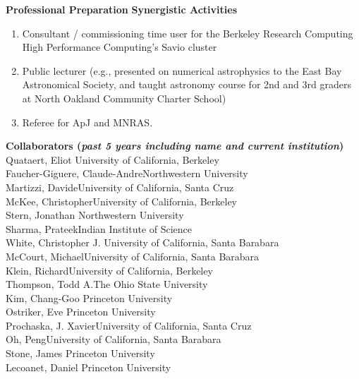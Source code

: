 \documentclass[11pt,letterpaper,english]{article}
\begin{document}
\begin{flushleft} {\bf Professional Preparation}
\vspace{.04in}
{\bf Synergistic Activities}
\vspace{-6pt}
\begin{enumerate} \itemsep1pt \parskip0pt 
\item Consultant / commissioning time user for the Berkeley Research Computing High Performance Computing's Savio cluster
\item Public lecturer (e.g., presented on numerical astrophysics to the East Bay Astronomical Society, and taught astronomy course for 2nd and 3rd graders at North Oakland Community Charter School) \\
\item Referee for ApJ and MNRAS. \\
\end{enumerate} 

\vspace{-6pt}
{\bf Collaborators ({\emph{past 5 years including name and current institution}})} \\
{\parindent 16pt
Quataert, Eliot \hfill University of California, Berkeley \\
Faucher-Giguere, Claude-Andre\hfill Northwestern University \\
Martizzi, Davide\hfill University of California, Santa Cruz \\
McKee, Christopher\hfill University of California, Berkeley \\
Stern, Jonathan \hfill Northwestern University \\
Sharma, Prateek\hfill Indian Institute of Science \\
White, Christopher J. \hfill University of California, Santa Barabara \\
McCourt, Michael\hfill University of California, Santa Barabara \\
Klein, Richard\hfill University of California, Berkeley \\
Thompson, Todd A.\hfill The Ohio State University \\
Kim, Chang-Goo \hfill Princeton University \\
Ostriker, Eve \hfill Princeton University \\
Prochaska, J. Xavier\hfill University of California, Santa Cruz \\
Oh, Peng\hfill University of California, Santa Barabara \\
Stone, James \hfill Princeton University \\
Lecoanet, Daniel \hfill Princeton University \\
}


\end{flushleft}
\end{document}
